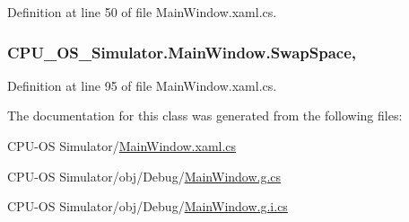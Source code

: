 Definition at line 50 of file Main\+Window.\+xaml.\+cs.

\hypertarget{class_c_p_u___o_s___simulator_1_1_main_window_a114d0bf1ca63b0d9213537758535aecf}{}
\subsubsection[{Swap\+Space}]{ C\+P\+U\+\_\+\+O\+S\+\_\+\+Simulator.\+Main\+Window.\+Swap\+Space\hspace{0.3cm}{\ttfamily [get]}, {\ttfamily [set]}}\label{class_c_p_u___o_s___simulator_1_1_main_window_a114d0bf1ca63b0d9213537758535aecf}


Definition at line 95 of file Main\+Window.\+xaml.\+cs.



The documentation for this class was generated from the following files\+:\begin{DoxyCompactItemize}
\item 
C\+P\+U-\/\+O\+S Simulator/\hyperlink{_main_window_8xaml_8cs}{Main\+Window.\+xaml.\+cs}\item 
C\+P\+U-\/\+O\+S Simulator/obj/\+Debug/\hyperlink{_debug_2_main_window_8g_8cs}{Main\+Window.\+g.\+cs}\item 
C\+P\+U-\/\+O\+S Simulator/obj/\+Debug/\hyperlink{_debug_2_main_window_8g_8i_8cs}{Main\+Window.\+g.\+i.\+cs}\end{DoxyCompactItemize}
